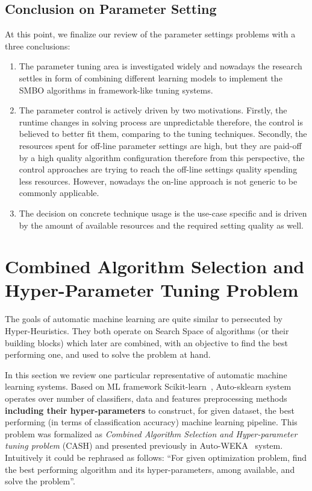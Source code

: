 \subsection{Conclusion on Parameter Setting}\label{bg: parameter setting conclution}
At this point, we finalize our review of the parameter settings problems with a three conclusions:
\begin{enumerate}
	\item The parameter tuning area is investigated widely and nowadays the research settles in form of combining different learning models to implement the SMBO algorithms in framework-like tuning systems.
	
	\item The parameter control is actively driven by two motivations. Firstly, the runtime changes in solving process are unpredictable therefore, the control is believed to better fit them, comparing to the tuning techniques. Secondly, the resources spent for off-line parameter settings are high, but they are paid-off by a high quality algorithm configuration therefore from this perspective, the control approaches are trying to reach the off-line settings quality spending less resources. However, nowadays the on-line approach is not generic to be commonly applicable.
	
	\item The decision on concrete technique usage is the use-case specific and is driven by the amount of available resources and the required setting quality as well.
\end{enumerate}

\section{Combined Algorithm Selection and Hyper-Parameter Tuning Problem}\label{bg: section cash}
The goals of automatic machine learning are quite similar to persecuted by Hyper-Heuristics. They both operate on Search Space of algorithms (or their building blocks) which later are combined, with an objective to find the best performing one, and used to solve the problem at hand. 

In this section we review one particular representative of automatic machine learning systems.
Based on ML framework Scikit-learn~\cite{scikit-learn}, Auto-sklearn system~\cite{feurer2015efficient} operates over number of classifiers, data and features preprocessing methods \textbf{including their hyper-parameters} to construct, for given dataset, the best performing (in terms of classification accuracy) machine learning pipeline.
This problem was formalized as \textit{Combined Algorithm Selection and Hyper-parameter tuning problem} (CASH) and presented previously in Auto-WEKA~\cite{thornton2013auto} system. Intuitively it could be rephrased as follows: ``For given optimization problem, find the best performing algorithm and its hyper-parameters, among available, and solve the problem''. 

